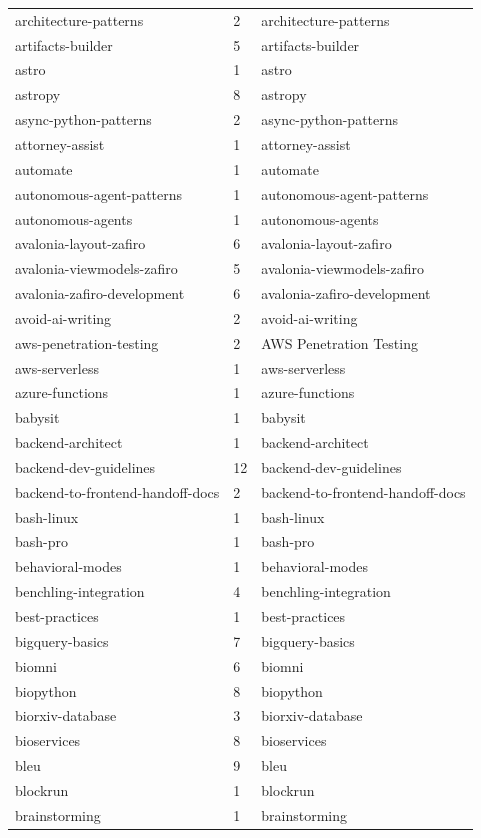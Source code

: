 \begin{longtable}{@{}lll@{}}
architecture-patterns & 2 & architecture-patterns\\
artifacts-builder & 5 & artifacts-builder\\
astro & 1 & astro\\
astropy & 8 & astropy\\
async-python-patterns & 2 & async-python-patterns\\
attorney-assist & 1 & attorney-assist\\
automate & 1 & automate\\
autonomous-agent-patterns & 1 & autonomous-agent-patterns\\
autonomous-agents & 1 & autonomous-agents\\
avalonia-layout-zafiro & 6 & avalonia-layout-zafiro\\
avalonia-viewmodels-zafiro & 5 & avalonia-viewmodels-zafiro\\
avalonia-zafiro-development & 6 & avalonia-zafiro-development\\
avoid-ai-writing & 2 & avoid-ai-writing\\
aws-penetration-testing & 2 & AWS Penetration Testing\\
aws-serverless & 1 & aws-serverless\\
azure-functions & 1 & azure-functions\\
babysit & 1 & babysit\\
backend-architect & 1 & backend-architect\\
backend-dev-guidelines & 12 & backend-dev-guidelines\\
backend-to-frontend-handoff-docs & 2 & backend-to-frontend-handoff-docs\\
bash-linux & 1 & bash-linux\\
bash-pro & 1 & bash-pro\\
behavioral-modes & 1 & behavioral-modes\\
benchling-integration & 4 & benchling-integration\\
best-practices & 1 & best-practices\\
bigquery-basics & 7 & bigquery-basics\\
biomni & 6 & biomni\\
biopython & 8 & biopython\\
biorxiv-database & 3 & biorxiv-database\\
bioservices & 8 & bioservices\\
bleu & 9 & bleu\\
blockrun & 1 & blockrun\\
brainstorming & 1 & brainstorming\\

\end{longtable}
